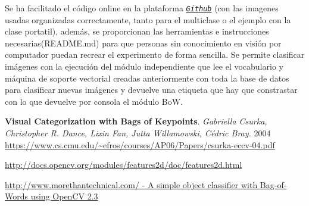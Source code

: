 \documentclass[a4paper,12pt]{article}
\begin{document}
Se ha facilitado el código online en la plataforma
\href{https://github.com/DavidGasquez/category-recognition}{\texttt{\emph{Github}}}
(con las imagenes usadas organizadas correctamente, tanto para el multiclase 
o el ejemplo con la clase portatil),
además, se  proporcionan las herramientas e instrucciones necesarias(README.md) para que 
personas sin conocimiento en visión por computador puedan recrear el experimento 
de forma sencilla. Se permite clasificar imágenes con la ejecución del módulo 
independiente que lee el vocabulario y máquina de soporte vectorial creadas 
anteriormente con toda la base de datos para clasificar nuevas imágenes y devuelve
una etiqueta que hay que constrastar con lo que devuelve por consola el módulo BoW.


\newpage
\begin{thebibliography}{99}

 \textbf{Visual Categorization with Bags of Keypoints}. 
 \emph{Gabriella Csurka, Christopher R. Dance, Lixin Fan, Jutta Willamowski, Cédric Bray.}
 2004 \url{https://www.cs.cmu.edu/~efros/courses/AP06/Papers/csurka-eccv-04.pdf}

 \url{http://docs.opencv.org/modules/features2d/doc/features2d.html}

 \href{http://www.morethantechnical.com/2011/08/25/a-simple-object-classifier-with-bag-of-words-using-opencv-2-3-w-code/}
{http://www.morethantechnical.com/ - A simple object classifier with Bag-of-Words using OpenCV 2.3}

\end{thebibliography}
\end{document}
